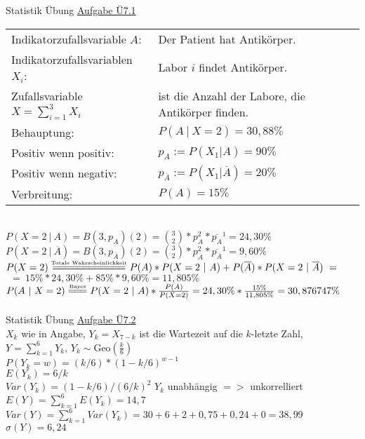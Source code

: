 \documentclass[12pt]{article} %
\newcommand{\aufgabe}[1]{{\huge Statistik Übung \underline{Aufgabe #1}}\\[3.5ex]  }
\begin{document}
\aufgabe{Ü7.1}
\begin{tabular}{l l}
Indikatorzufallsvariable $A$: & Der Patient hat Antikörper. \\
Indikatorzufallsvariablen $X_i$: & Labor $i$ findet Antikörper. \\
Zufallsvariable $X = \sum_{i=1}^{3}{X_i}$ & ist die Anzahl der Labore, die Antikörper finden. \\
Behauptung: & $P(A ~ | ~ X=2) = 30,88\%$ \\
Positiv wenn positiv: & $p_A := P(X_1 | A ) = 90 \%$ \\
Positiv wenn negativ: & $p_{\overline{A}} := P(X_1 | \overline{A}) = 20\%$ \\
Verbreitung: & $P(A) = 15\%$ \\
\end{tabular}\\
$P(X=2 ~ | ~ A) = B(3, p_A)({2}) = \binom{3}{2}*p_{A}^2*\overline{p_A}^1 = 24,30 \%$ \\
$P(X=2 ~ | ~ \overline{A}) = B(3, p_{\overline{A}})({2}) = \binom{3}{2}*p_{\overline{A}}^2*\overline{p_{\overline{A}}}^1 = 9,60 \%$ \\
$P(X=2) \overset{\text{\tiny{Totale Wahrscheinlichkeit}}}{=\joinrel=\joinrel=\joinrel=\joinrel=\joinrel=\joinrel=\joinrel=\joinrel=\joinrel=\joinrel=\joinrel=} P(A) * P(X=2 ~ | ~ A) + P(\overline{A}) * P(X=2 ~ | ~ \overline{A}) ~ = $ \\
$~~ = ~ 15 \% * 24,30 \% + 85 \% * 9,60 \% = 11,805\% $ \\ 
$P(A ~ | ~ X=2) \overset{\text{\tiny{Bayes}}}{=\joinrel=\joinrel=} P(X=2 ~ | ~ A) * \frac{P(A)}{P(X=2)} = 24,30\% * \frac{15\%}{11,805\%} = 30,876747\% $ \\[1ex]
\- \dotfill
\\[4ex]
\aufgabe{Ü7.2}
$X_k$ wie in Angabe, $Y_k = X_{7-k}$ ist die Wartezeit auf die $k$-letzte Zahl, \\
$Y = \sum_{k=1}^{6}{Y_k}$, $Y_k \sim \text{Geo}(\frac{k}{6})$\\ 
$P(Y_k=w) = (k/6) * (1- k/6)^{w-1}$ \\
$E(Y_k) = 6/k$ \\
$Var(Y_k) = (1-k/6) / (6/k)^2$
$Y_k$ unabhängig $ => $ unkorrelliert \\[0.1cm]
$E(Y) = \sum_{k=1}^{6}{E(Y_k)} = 14,7 $ \\
$Var(Y) = \sum_{k=1}^{6}{Var(Y_k)} = 30+6+2+0,75+0,24+0 = 38,99 $\\
$\sigma(Y) = 6,24$ \\[1ex]
\- \dotfill
\end{document}

